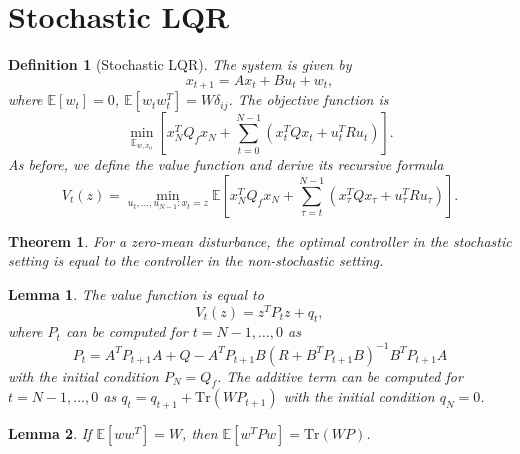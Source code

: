 \documentclass[a4 paper]{article}
\numberwithin{equation}{section}
\theoremstyle{boldStyle}
\theoremstyle{boldBlueStyle}
\newtheorem{lemma}{Lemma}[section]
\theoremstyle{boldPurpleStyle}
\newtheorem{theorem}{Theorem}[section]
\theoremstyle{boldRedStyle}
\newtheorem{definition}{Definition}[section]
\theoremstyle{boldGreenStyle}
\begin{document}
\section{Stochastic LQR}


\begin{definition}[Stochastic LQR]
  The system is given by
  \[
  x_{t+1} = A x_t + B u_t + w_t,
  \]
  where \(\mathbb{E}[w_t] = 0\), \(\mathbb{E}[w_t w_t^T] = W \delta_{ij}\). The objective function is
  \[
  \min_{\mathbb{E}_{w,x_0}} \left[ x_N^T Q_f x_N + \sum_{t=0}^{N-1} \left( x_t^T Q x_t + u_t^T R u_t \right) \right].
  \]
  As before, we define the value function and derive its recursive formula
  \[
  V_t(z) = \min_{u_t, \ldots, u_{N-1}: x_t = z} \mathbb{E} \left[ x_N^T Q_f x_N + \sum_{\tau=t}^{N-1} \left( x_{\tau}^T Q x_{\tau} + u_{\tau}^T R u_{\tau} \right) \right].
  \]
\end{definition}
  
\begin{theorem}
  For a zero-mean disturbance, the optimal controller in the stochastic setting is equal to the controller in the non-stochastic setting.
\end{theorem}


\begin{lemma}
  The value function is equal to
  \[
  V_t(z) = z^T P_t z + q_t,
  \]
  where \( P_t \) can be computed for \( t = N-1, \ldots, 0 \) as
  \[
  P_t = A^T P_{t+1} A + Q - A^T P_{t+1} B (R + B^T P_{t+1} B)^{-1} B^T P_{t+1} A
  \]
  with the initial condition \( P_N = Q_f \). The additive term can be computed for \( t = N-1, \ldots, 0 \) 
  as \( q_t = q_{t+1} + \text{Tr}(W P_{t+1}) \) with the initial condition \( q_N = 0 \).
\end{lemma}


\begin{lemma}
  If \( \mathbb{E}[w w^T] = W \), then \( \mathbb{E}[w^T P w] = \text{Tr}(W P) \).
\end{lemma}










\newpage
\end{document}
